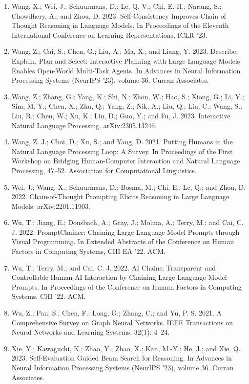 \documentclass[11pt,UTF8,fontset=fandol]{ctexart}
\begin{document}
\begin{enumerate}[leftmargin=2em]
\item Wang, X.; Wei, J.; Schuurmans, D.; Le, Q. V.; Chi, E. H.; Narang, S.; Chowdhery, A.; and Zhou, D. 2023. Self-Consistency Improves Chain of Thought Reasoning in Language Models. In Proceedings of the Eleventh International Conference on Learning Representations, ICLR '23.
\item Wang, Z.; Cai, S.; Chen, G.; Liu, A.; Ma, X.; and Liang, Y. 2023. Describe, Explain, Plan and Select: Interactive Planning with Large Language Models Enables Open-World Multi-Task Agents. In Advances in Neural Information Processing Systems (NeurIPS '23), volume 36. Curran Associates.
\item Wang, Z.; Zhang, G.; Yang, K.; Shi, N.; Zhou, W.; Hao, S.; Xiong, G.; Li, Y.; Sim, M. Y.; Chen, X.; Zhu, Q.; Yang, Z.; Nik, A.; Liu, Q.; Lin, C.; Wang, S.; Liu, R.; Chen, W.; Xu, K.; Liu, D.; Guo, Y.; and Fu, J. 2023. Interactive Natural Language Processing. arXiv:2305.13246.
\item Wang, Z. J.; Choi, D.; Xu, S.; and Yang, D. 2021. Putting Humans in the Natural Language Processing Loop: A Survey. In Proceedings of the First Workshop on Bridging Human-Computer Interaction and Natural Language Processing, 47--52. Association for Computational Linguistics.
\item Wei, J.; Wang, X.; Schuurmans, D.; Bosma, M.; Chi, E.; Le, Q.; and Zhou, D. 2022. Chain-of-Thought Prompting Elicits Reasoning in Large Language Models. arXiv:2201.11903.
\item Wu, T.; Jiang, E.; Donsbach, A.; Gray, J.; Molina, A.; Terry, M.; and Cai, C. J. 2022. PromptChainer: Chaining Large Language Model Prompts through Visual Programming. In Extended Abstracts of the Conference on Human Factors in Computing Systems, CHI EA '22. ACM.
\item Wu, T.; Terry, M.; and Cai, C. J. 2022. AI Chains: Transparent and Controllable Human-AI Interaction by Chaining Large Language Model Prompts. In Proceedings of the Conference on Human Factors in Computing Systems, CHI '22. ACM.
\item Wu, Z.; Pan, S.; Chen, F.; Long, G.; Zhang, C.; and Yu, P. S. 2021. A Comprehensive Survey on Graph Neural Networks. IEEE Transactions on Neural Networks and Learning Systems, 32(1): 4--24.
\item Xie, Y.; Kawaguchi, K.; Zhao, Y.; Zhao, X.; Kan, M.-Y.; He, J.; and Xie, Q. 2023. Self-Evaluation Guided Beam Search for Reasoning. In Advances in Neural Information Processing Systems (NeurIPS '23), volume 36. Curran Associates.

\end{enumerate}
\end{document}
